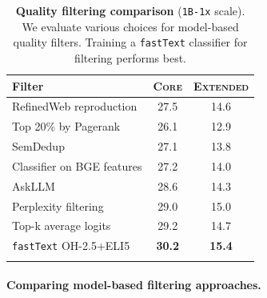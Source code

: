 \documentclass{article}
\newcommand{\oh}{\textsc{OH-2.5}\xspace}
\newcommand{\strack}{\texttt{1B-1x}\xspace}
\newcommand{\fasttext}{\texttt{fastText}\xspace}
\newcommand{\lowvar}{\textsc{Core}\xspace}
\newcommand{\aggscore}{\textsc{Extended}\xspace}
\begin{document}
\begin{table}[t]
\centering
\caption{\textbf{Quality filtering comparison} (\strack scale). We evaluate various choices for model-based quality filters. Training a \fasttext classifier for filtering performs best.}
\label{tab:quality_filtering}

\begin{tabular}{lcc}
\toprule
                                            Filter &       \lowvar &     \aggscore \\
\midrule
                           RefinedWeb reproduction &          27.5 &          14.6 \\
\midrule
                              Top 20\% by Pagerank &          26.1 &          12.9 \\
                SemDedup \citep{abbas2023semdedup} &          27.1 &          13.8 \\
Classifier on BGE features \citep{bge_embedding}   &          27.2 &          14.0 \\
                  AskLLM \citep{sachdeva2024train} &          28.6 &          14.3 \\
                              Perplexity filtering &          29.0 &          15.0 \\
                              Top-k average logits &          29.2 &          14.7 \\
           \fasttext \citep{joulin2017bag} \oh+ELI5 & \textbf{30.2} & \textbf{15.4} \\\bottomrule
\vspace{-0.5cm}
\end{tabular}

\end{table}

\paragraph{Comparing model-based filtering approaches.}
\end{document}
